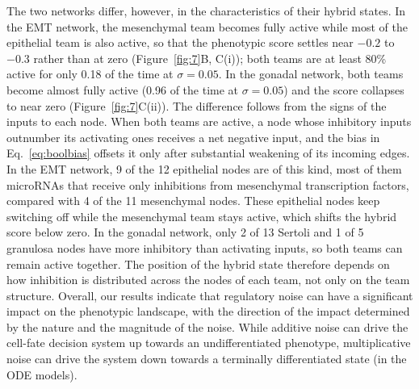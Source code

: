 \documentclass[11pt]{article}
\providecommand{\DIFaddtex}[1]{{\protect\color{red}#1}} %
\providecommand{\DIFdeltex}[1]{} %
\providecommand{\DIFaddbegin}{} %
\providecommand{\DIFaddend}{} %
\providecommand{\DIFdelbegin}{} %
\providecommand{\DIFdelend}{} %
\providecommand{\DIFadd}[1]{\texorpdfstring{\DIFaddtex{#1}}{#1}} %
\providecommand{\DIFdel}[1]{\texorpdfstring{\DIFdeltex{#1}}{}} %
\providecommand{\DIFaddincludegraphics}[2][]{\DIFOincludegraphics[#1]{#2}} %
\providecommand{\DIFdelincludegraphics}[2][]{}
\DeclareRobustCommand{\DIFaddbegin}{\DIFOaddbegin \let\includegraphics\DIFaddincludegraphics} %
\DeclareRobustCommand{\DIFaddend}{\DIFOaddend \let\includegraphics\DIFOincludegraphics} %
\DeclareRobustCommand{\DIFdelbegin}{\DIFOdelbegin \let\includegraphics\DIFdelincludegraphics} %
\DeclareRobustCommand{\DIFdelend}{\DIFOaddend \let\includegraphics\DIFOincludegraphics} %
\begin{document}
The two networks differ, however, in the characteristics of their hybrid states. In the EMT network, the \DIFdelbegin \DIFdel{hybrid phenotypic score distribution retains some polarization toward $\pm 0.5$--$0.75$, reflecting a tendency for one team to remain more active than the other even in the hybrid regime }\DIFdelend \DIFaddbegin \DIFadd{mesenchymal team becomes fully active while most of the epithelial team is also active, so that the phenotypic score settles near $-0.2$ to $-0.3$ rather than at zero }\DIFaddend (Figure~\ref{fig:7}\DIFaddbegin \DIFadd{B, }\DIFaddend C(i)\DIFdelbegin \DIFdel{, B)}\DIFdelend \DIFaddbegin \DIFadd{); both teams are at least 80\% active for only 0.18 of the time at $\sigma = 0.05$}\DIFaddend . In the \DIFdelbegin \DIFdel{Gonadal network, the distribution collapses tightly }\DIFdelend \DIFaddbegin \DIFadd{gonadal network, both teams become almost fully active (0.96 of the time at $\sigma = 0.05$) and the score collapses }\DIFaddend to near zero \DIFdelbegin \DIFdel{, indicating near-equal team expression with no residual polarization }\DIFdelend (Figure~\ref{fig:7}C(ii)). \DIFdelbegin \DIFdel{Both networks have similar densities and team structures to each other, suggesting that network size and specific wiring topology beyond the team structure are likely contributors to this difference.A full characterization of }\DIFdelend %
\DIFaddbegin \DIFadd{The difference follows from the signs of the inputs to each node. When both teams are active, a node whose inhibitory inputs outnumber its activating ones receives a net negative input, and }\DIFaddend the \DIFdelbegin \DIFdel{structural features that determine the degree of polarization within the hybrid regime remains an open question}\DIFdelend \DIFaddbegin \DIFadd{bias in Eq.~\ref{eq:boolbias} offsets it only after substantial weakening of its incoming edges. In the EMT network, 9 of the 12 epithelial nodes are of this kind, most of them microRNAs that receive only inhibitions from mesenchymal transcription factors, compared with 4 of the 11 mesenchymal nodes. These epithelial nodes keep switching off while the mesenchymal team stays active, which shifts the hybrid score below zero. In the gonadal network, only 2 of 13 Sertoli and 1 of 5 granulosa nodes have more inhibitory than activating inputs, so both teams can remain active together. The position of the hybrid state therefore depends on how inhibition is distributed across the nodes of each team, not only on the team structure}\DIFaddend . Overall, our results indicate that regulatory noise can have a significant impact on the phenotypic landscape, with the direction of the impact determined by the nature and the magnitude of the noise. While additive noise can drive the cell-fate decision system up towards an undifferentiated phenotype, multiplicative noise can drive the system down towards a terminally differentiated state \DIFaddbegin \DIFadd{(in the ODE models)}\DIFaddend . 
\end{document}
